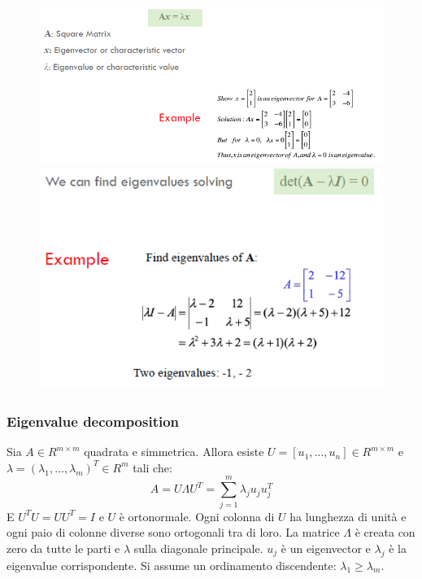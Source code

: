 		\begin{figure}
			\centering
			\begin{minipage}{.6\textwidth}
				\centering
				\includegraphics[width=1\linewidth]{imgs/chapter12/img3}
				\caption{}
				\label{fig:chapter12-03}
			\end{minipage}%
			\begin{minipage}{.4\textwidth}
				\centering
				\includegraphics[width=1\linewidth]{imgs/chapter12/img4}
				\caption{}
				\label{fig:chapter12-04}
			\end{minipage}
		\end{figure}
		
		\subsubsection{Eigenvalue decomposition}
		Sia $A\in R^{m\times m}$ quadrata e simmetrica.
		Allora esiste $U=[u_1,\dots,u_n]\in R^{m\times m}$ e $\lambda=(\lambda_1,\dots,\lambda_m)^T\in R^m$ tali che:
		$$A = U\Lambda U^T=\sum\limits_{j=1}^m\lambda_ju_ju_j^T$$
		E $U^TU=UU^T=I$ e $U$ \`e ortonormale.
		Ogni colonna di $U$ ha lunghezza di unit\`a e ogni paio di colonne diverse sono ortogonali tra di loro.
		La matrice $\Lambda$ \`e creata con zero da tutte le parti e $\lambda$ sulla diagonale principale.
		$u_j$ \`e un eigenvector e $\lambda_j$ \`e la eigenvalue corrispondente.
		Si assume un ordinamento discendente: $\lambda_1\ge \lambda_m$.
		
